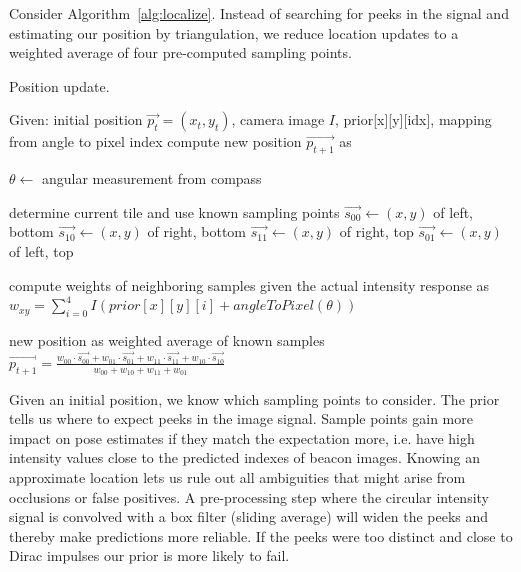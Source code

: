 Consider Algorithm~\ref{alg:localize}. Instead of searching for peeks in the signal 
and estimating our position by triangulation,
we reduce location updates to a weighted average of four pre-computed sampling points.


\begin{algorithm}
\caption{Position update.}
\label{alg:localize}
\begin{algorithmic}[1]
    \Statex Given: initial position $\vec{p_t} = (x_t, y_t)$, camera image $I$, prior[x][y][idx], mapping from angle to pixel index
    \Statex compute new position $\vec{p_{t+1}}$ as
    \Statex 
    
    \State $\theta \gets$ angular measurement from compass
    \Statex

    \Statex determine current tile and use known sampling points
    \State $\vec{s_{00}} \gets (x, y)$ of left, bottom
    \State $\vec{s_{10}} \gets (x, y)$ of right, bottom
    \State $\vec{s_{11}} \gets (x, y)$ of right, top
    \State $\vec{s_{01}} \gets (x, y)$ of left, top
    \Statex
    
    \Statex compute weights of neighboring samples given the actual intensity response as
        \State $w_{xy} = \sum_{i = 0}^4 I(prior[x][y][i] + angleToPixel(\theta))$
    \EndFor
    \Statex 

    \Statex new position as weighted average of known samples
    \State $\vec{p_{t + 1}} = \frac{w_{00} \cdot \vec{s_{00}} 
            + w_{01} \cdot \vec{s_{01}} 
            + w_{11} \cdot \vec{s_{11}}
            + w_{10} \cdot \vec{s_{10}}}
            {w_{00} + w_{10} + w_{11} + w_{01}}$ 

\end{algorithmic}
\end{algorithm}

Given an initial position, we know which sampling points to consider. The prior
tells us where to expect peeks in the image signal. Sample points gain more impact
on pose estimates if they match the expectation more, i.e. have high intensity values 
close to the predicted indexes of beacon images. Knowing an approximate location
lets us rule out all ambiguities that might arise from occlusions or false positives.
A pre-processing step where the circular intensity signal is convolved with a box
filter (sliding average) will widen the peeks and thereby make predictions more
reliable. If the peeks were too distinct and close to Dirac impulses our prior 
is more likely to fail.

